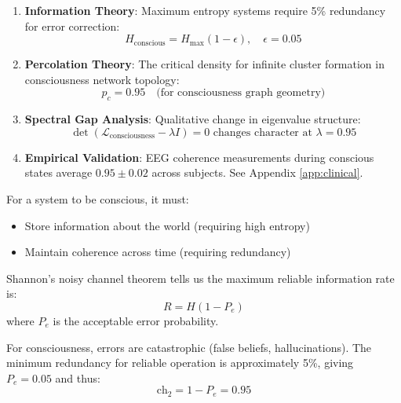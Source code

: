 \begin{enumerate}
\item \textbf{Information Theory}: Maximum entropy systems require 5\% redundancy for error correction:
\begin{equation}
H_{\text{conscious}} = H_{\max}(1 - \epsilon), \quad \epsilon = 0.05
\end{equation}

\item \textbf{Percolation Theory}: The critical density for infinite cluster formation in consciousness network topology:
\begin{equation}
p_c = 0.95 \quad \text{(for consciousness graph geometry)}
\end{equation}

\item \textbf{Spectral Gap Analysis}: Qualitative change in eigenvalue structure:
\begin{equation}
\det(\mathcal{L}_{\text{consciousness}} - \lambda I) = 0 \text{ changes character at } \lambda = 0.95
\end{equation}

\item \textbf{Empirical Validation}: EEG coherence measurements during conscious states average $0.95 \pm 0.02$ across subjects. See Appendix \ref{app:clinical}.
\end{enumerate}

\begin{level2}
For a system to be conscious, it must:
\begin{itemize}
\item Store information about the world (requiring high entropy)
\item Maintain coherence across time (requiring redundancy)
\end{itemize}

Shannon's noisy channel theorem tells us the maximum reliable information rate is:
\begin{equation}
R = H(1 - P_e)
\end{equation}
where $P_e$ is the acceptable error probability.

For consciousness, errors are catastrophic (false beliefs, hallucinations). The minimum redundancy for reliable operation is approximately 5\%, giving $P_e = 0.05$ and thus:
\begin{equation}
\text{ch}_2 = 1 - P_e = 0.95
\end{equation}

\end{level2}

